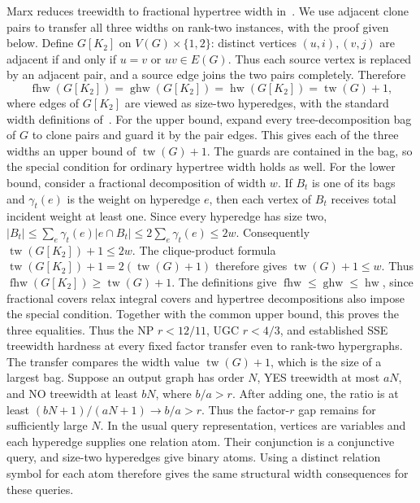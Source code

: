 Marx reduces treewidth to fractional hypertree width
in~\cite[proof of Theorem~5.1]{Marx2010Fractional}. We use adjacent
clone pairs to transfer all three widths on
rank-two instances, with the proof given below. Define $G[K_2]$ on
$V(G)\times\{1,2\}$: distinct vertices $(u,i),(v,j)$ are adjacent
if and only if $u=v$ or $uv\in E(G)$. Thus each source vertex is
replaced by an adjacent pair, and a source edge joins the two pairs
completely. Therefore
\[
 \operatorname{fhw}(G[K_2])=\operatorname{ghw}(G[K_2])
 =\operatorname{hw}(G[K_2])=\operatorname{tw}(G)+1,
\]
where edges of $G[K_2]$ are viewed as size-two hyperedges, with the
standard width definitions of~\cite{GottlobEtAlHypertree}.
For the upper bound, expand every tree-decomposition bag of $G$
to clone pairs and guard it by the pair edges. This gives each of
the three widths an upper bound of $\operatorname{tw}(G)+1$.
The guards are contained in the bag, so the special condition for
ordinary hypertree width holds as well. For the lower bound, consider a
fractional decomposition of width $w$. If $B_t$ is one of its bags
and $\gamma_t(e)$ is the weight on hyperedge $e$, then each vertex
of $B_t$ receives total incident weight at least one. Since every
hyperedge has size two,
$|B_t|\leq\sum_e\gamma_t(e)|e\cap B_t|\leq2\sum_e\gamma_t(e)\leq2w$.
Consequently $\operatorname{tw}(G[K_2])+1\leq2w$.
The clique-product formula
$\operatorname{tw}(G[K_2])+1=2(\operatorname{tw}(G)+1)$
\cite[Theorem~24]{GurskiWeishaupt2025} therefore gives
$\operatorname{tw}(G)+1\leq w$. Thus
$\operatorname{fhw}(G[K_2])\geq\operatorname{tw}(G)+1$. The definitions
give $\operatorname{fhw}\leq\operatorname{ghw}\leq\operatorname{hw}$,
since fractional covers relax integral covers and hypertree
decompositions also impose the special condition. Together with the
common upper bound, this proves the three equalities.
Thus the \textup{NP} $r<12/11$, \textup{UGC} $r<4/3$, and established \textup{SSE} treewidth
hardness at every fixed factor transfer even to rank-two hypergraphs.
The transfer compares the width value $\operatorname{tw}(G)+1$, which
is the size of a largest bag. Suppose an output graph has order $N$,
YES treewidth at most $aN$, and NO treewidth at least $bN$, where
$b/a>r$. After adding one, the ratio is at least
$(bN+1)/(aN+1)\to b/a>r$. Thus the factor-$r$ gap remains for
sufficiently large $N$.
In the usual query representation, vertices are variables and
each hyperedge supplies one relation atom. Their conjunction is
a conjunctive query, and size-two hyperedges give binary atoms.
Using a distinct relation symbol for each atom therefore gives
the same structural width consequences for these queries.

